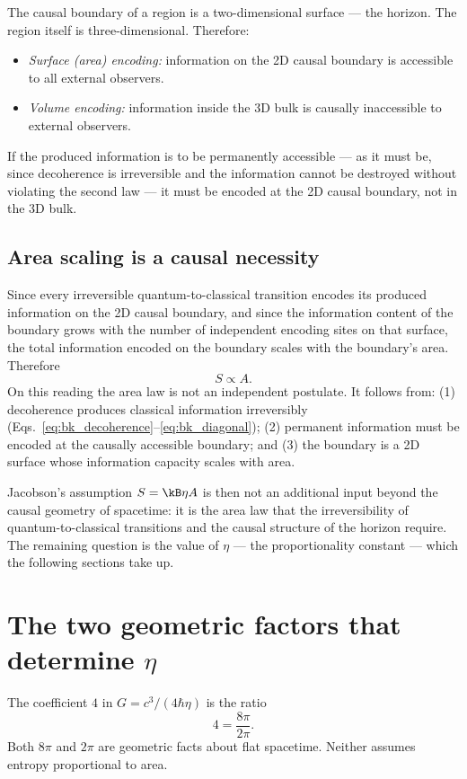 The causal boundary of a region is a two-dimensional surface --- the horizon. The region itself is three-dimensional. Therefore:
\begin{itemize}
\item \emph{Surface (area) encoding:} information on the 2D causal boundary is accessible to all external observers.
\item \emph{Volume encoding:} information inside the 3D bulk is causally inaccessible to external observers.
\end{itemize}
If the produced information is to be permanently accessible --- as it must be, since decoherence is irreversible and the information cannot be
destroyed without violating the second law --- it must be encoded at the 2D causal boundary, not in the 3D bulk.

\subsection{Area scaling is a causal necessity}
Since every irreversible quantum-to-classical transition encodes its produced information on the 2D causal boundary, and since the information content
of the boundary grows with the number of independent encoding sites on that surface, the total information encoded on the boundary scales with the
boundary's area. Therefore
\begin{equation}
S\propto A.\label{eq:bk_SpropA}
\end{equation}
On this reading the area law is not an independent postulate. It follows from: (1) decoherence produces classical information irreversibly
(Eqs.~\eqref{eq:bk_decoherence}--\eqref{eq:bk_diagonal}); (2) permanent information must be encoded at the causally accessible boundary; and (3) the boundary is a
2D surface whose information capacity scales with area. \interp

Jacobson's assumption $S=\kB\eta A$ is then not an additional input beyond the causal geometry of spacetime: it is the area law that the
irreversibility of quantum-to-classical transitions and the causal structure of the horizon require. The remaining question is the value of $\eta$ ---
the proportionality constant --- which the following sections take up. \interp

\section{The two geometric factors that determine $\eta$}\label{sec:bk_factors}
The coefficient $4$ in $G=c^3/(4\hbar\eta)$ is the ratio
\begin{equation}
4=\frac{8\pi}{2\pi}.\label{eq:bk_four}
\end{equation}
Both $8\pi$ and $2\pi$ are geometric facts about flat spacetime. Neither assumes entropy proportional to area.


